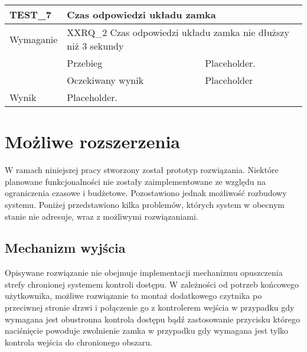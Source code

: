 \begin{table}[h!]
\begin{subtable}[c]{\textwidth}
                \centering
                    \begin{tabular}{|p{2cm}|p{}|p{}|}
                    \hline
                    TEST\_7               & \multicolumn{2}{l|}{\textbf{Czas odpowiedzi układu zamka}}                                                            \\ \hline
                    \cellcolor[gray]{0.8} Wymaganie             & \multicolumn{2}{p{12cm}|}{XXRQ\_2 Czas odpowiedzi układu zamka nie dłuższy niż 3 sekundy }                                                                                    \\ \hline
                    \cellcolor[gray]{0.8} \multirow{2}{*}{Opis} & Przebieg           & Placeholder.  \\ \cline{2-3} 
                    \cellcolor[gray]{0.8}                      & Oczekiwany wynik   & Placeholder                                                 \\ \hline
                    \cellcolor[gray]{0.8} Wynik                 & \multicolumn{2}{p{12cm}|}{Placeholder.}                                                                                  \\ \hline
                    \end{tabular}%
                \label{tbl:test6}
                \vspace{10mm}           
            \end{subtable}
            \label{tbl:tests}
        \end{table}

	\section{Możliwe rozszerzenia}

        W ramach niniejszej pracy stworzony został prototyp rozwiązania. Niektóre planowane funkcjonalności nie zostały zaimplementowane ze względu na ograniczenia czasowe i budżetowe. Pozostawiono jednak możliwość rozbudowy systemu. Poniżej przedstawiono kilka problemów, których system w obecnym stanie nie adresuje, wraz z możliwymi rozwiązaniami.

        \subsection{Mechanizm wyjścia}

            Opisywane rozwiązanie nie obejmuje implementacji mechanizmu opuszczenia strefy chronionej systemem kontroli dostępu. W zależności od potrzeb końcowego użytkownika, możliwe rozwiązanie to montaż dodatkowego czytnika po przeciwnej stronie drzwi i połączenie go z kontrolerem wejścia w przypadku gdy wymagana jest obustronna kontrola dostępu bądź zastosowanie przycisku którego naciśnięcie powoduje zwolnienie zamka w przypadku gdy wymagana jest tylko kontrola wejścia do chronionego obszaru.

